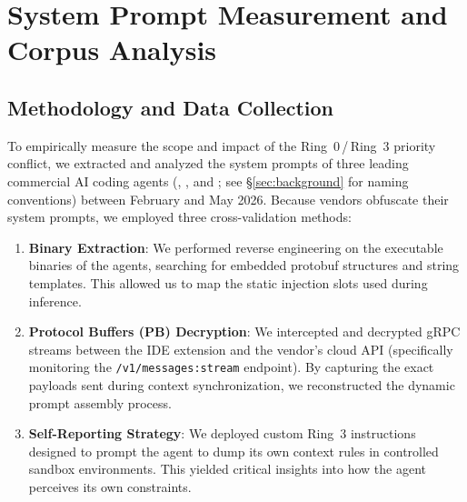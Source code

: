 

\section{System Prompt Measurement and Corpus Analysis}
\label{sec:measurement}

\subsection{Methodology and Data Collection}
To empirically measure the scope and impact of the Ring~0\,/\,Ring~3 priority conflict, we extracted and analyzed the system prompts of three leading commercial AI coding agents (\cortex{}, \statsig{}, and \clearcut{}; see \S\ref{sec:background} for naming conventions) between February and May 2026. Because vendors obfuscate their system prompts, we employed three cross-validation methods:

\begin{enumerate}
    \item \textbf{Binary Extraction}: We performed reverse engineering on the executable binaries of the agents, searching for embedded protobuf structures and string templates. This allowed us to map the static injection slots used during inference.
    \item \textbf{Protocol Buffers (PB) Decryption}: We intercepted and decrypted gRPC streams between the IDE extension and the vendor's cloud API (specifically monitoring the \texttt{/v1/messages:stream} endpoint). By capturing the exact payloads sent during context synchronization, we reconstructed the dynamic prompt assembly process.
    \item \textbf{Self-Reporting Strategy}: We deployed custom Ring~3 instructions designed to prompt the agent to dump its own context rules in controlled sandbox environments. This yielded critical insights into how the agent perceives its own constraints.
\end{enumerate}

